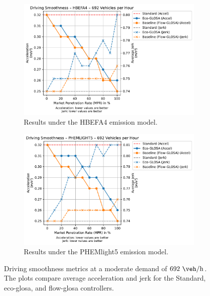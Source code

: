 \begin{figure}[htbp]
  \centering
  \begin{subfigure}[b]{0.98\textwidth}
    \includegraphics[width=\textwidth]{data/img/DrivingSmoothness/DrivingSmoothness_HBEFA4_Cars692.pdf}
    \caption{Results under the HBEFA4 emission model.}
    \label{fig:Smoothness_HBEFA4_692}
  \end{subfigure}
  \begin{subfigure}[b]{0.98\textwidth}
    \includegraphics[width=\textwidth]{data/img/DrivingSmoothness/DrivingSmoothness_PHEMLIGHT5_Cars692.pdf}
    \caption{Results under the PHEMlight5 emission model.}
    \label{fig:Smoothness_PHEMlight5_692}
  \end{subfigure}
  \caption[Driving smoothness metrics at $692~\unit{\veh\per\hour}$]{Driving smoothness metrics at a moderate demand of $692~\unit{\veh\per\hour}$. The plots compare average acceleration and jerk for the Standard, \ac{eco-glosa}, and \ac{flow-glosa} controllers.}
  \label{fig:Smoothness_692}
\end{figure}

